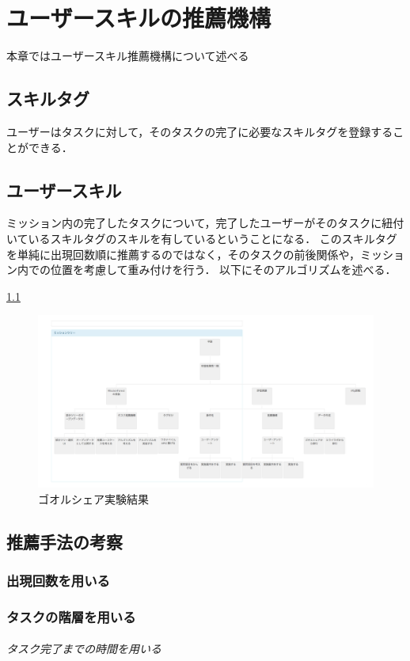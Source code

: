 \chapter{ユーザースキルの推薦機構}
本章ではユーザースキル推薦機構について述べる

\section{スキルタグ}
ユーザーはタスクに対して，そのタスクの完了に必要なスキルタグを登録することができる．

\section{ユーザースキル}
ミッション内の完了したタスクについて，完了したユーザーがそのタスクに紐付いているスキルタグのスキルを有しているということになる．
このスキルタグを単純に出現回数順に推薦するのではなく，そのタスクの前後関係や，ミッション内での位置を考慮して重み付けを行う．
以下にそのアルゴリズムを述べる．


\ref{img:large_mission}

\begin{figure}[t]
	\begin{center}
		\includegraphics[width=0.9\linewidth]{assets/img/large_mission.png}
		\caption{ゴオルシェア実験結果}
		\label{img:large_mission}
	\end{center}
\end{figure}

\section{推薦手法の考察}

\subsection{出現回数を用いる}

\subsection{タスクの階層を用いる}

\subparagraph{タスク完了までの時間を用いる}
